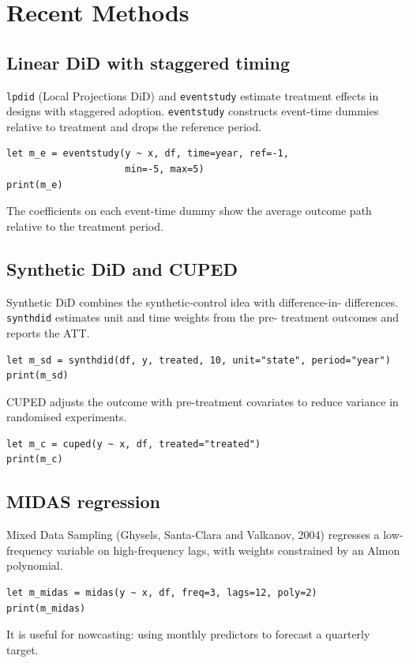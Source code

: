 \chapter{Recent Methods}

\section{Linear DiD with staggered timing}

\texttt{lpdid} (Local Projections DiD) and \texttt{eventstudy} estimate treatment
effects in designs with staggered adoption. \texttt{eventstudy} constructs
event-time dummies relative to treatment and drops the reference period.

\begin{lstlisting}[caption={Event study}]
let m_e = eventstudy(y ~ x, df, time=year, ref=-1,
                     min=-5, max=5)
print(m_e)
\end{lstlisting}

The coefficients on each event-time dummy show the average outcome path
relative to the treatment period.

\section{Synthetic DiD and CUPED}

Synthetic DiD combines the synthetic-control idea with difference-in-
differences. \texttt{synthdid} estimates unit and time weights from the pre-
treatment outcomes and reports the ATT.

\begin{lstlisting}[caption={Synthetic DiD}]
let m_sd = synthdid(df, y, treated, 10, unit="state", period="year")
print(m_sd)
\end{lstlisting}

CUPED adjusts the outcome with pre-treatment covariates to reduce
variance in randomised experiments.

\begin{lstlisting}[caption={CUPED}]
let m_c = cuped(y ~ x, df, treated="treated")
print(m_c)
\end{lstlisting}

\section{MIDAS regression}

Mixed Data Sampling (Ghysels, Santa-Clara and Valkanov, 2004) regresses
a low-frequency variable on high-frequency lags, with weights constrained
by an Almon polynomial.

\begin{lstlisting}[caption={MIDAS}]
let m_midas = midas(y ~ x, df, freq=3, lags=12, poly=2)
print(m_midas)
\end{lstlisting}

It is useful for nowcasting: using monthly predictors to forecast a
quarterly target.
